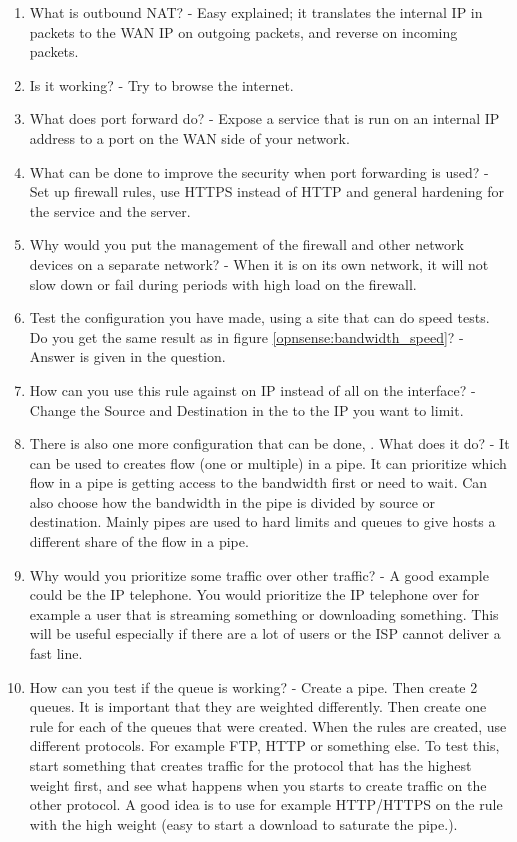 \begin{enumerate}
    \item What is outbound NAT? - Easy explained; it translates the internal IP in packets to the WAN IP on outgoing packets, and reverse on incoming packets.
    \item Is it working? - Try to browse the internet.
    \item What does port forward do? - Expose a service that is run on an internal IP address to a port on the WAN side of your network.
    \item What can be done to improve the security when port forwarding is used? - Set up firewall rules, use HTTPS instead of HTTP and general hardening for the service and the server.
    \item Why would you put the management of the firewall and other network devices on a separate network? - When it is on its own network, it will not slow down or fail during periods with high load on the firewall.
    \item Test the configuration you have made, using a site that can do speed tests. Do you get the same result as in figure \ref{opnsense:bandwidth_speed}? - Answer is given in the question.
    \item How can you use this rule against on IP instead of all on the interface? - Change the Source and Destination in the  to the IP you want to limit.
    \item There is also one more configuration that can be done, . What does it do? - It can be used to creates flow (one or multiple) in a pipe. It can prioritize which flow in a pipe is getting access to the bandwidth first or need to wait. Can also choose how the bandwidth in the pipe is divided by source or destination. Mainly pipes are used to hard limits and queues to give hosts a different share of the flow in a pipe.
    \item Why would you prioritize some traffic over other traffic? - A good example could be the IP telephone. You would prioritize the IP telephone over for example a user that is streaming something or downloading something. This will be useful especially if there are a lot of users or the ISP cannot deliver a fast line.
    \item How can you test if the queue is working? - Create a pipe. Then create 2 queues. It is important that they are weighted differently. Then create one rule for each of the queues that were created. When the rules are created, use different protocols. For example FTP, HTTP or something else. To test this, start something that creates traffic for the protocol that has the highest weight first, and see what happens when you starts to create traffic on the other protocol. A good idea is to use for example HTTP/HTTPS on the rule with the high weight (easy to start a download to saturate the pipe.).

\end{enumerate}
